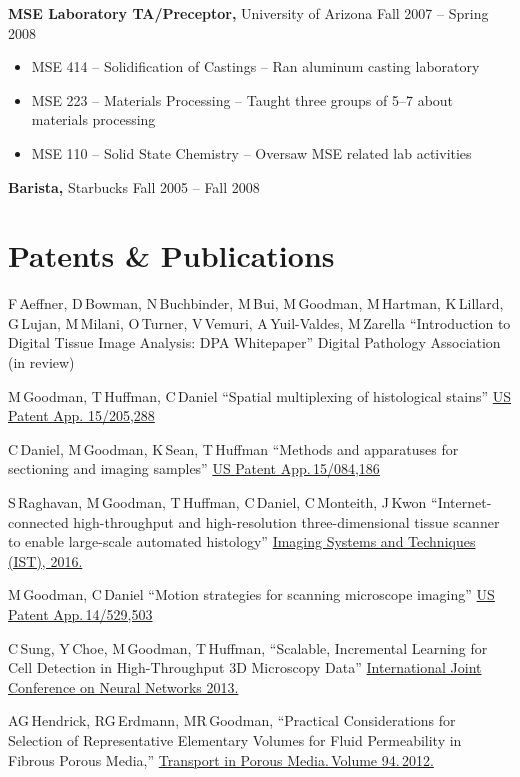 \documentclass{res}
\begin{document}
\begin{resume}
{\bf MSE Laboratory TA/Preceptor,} University of Arizona \hfill Fall 2007 -- Spring 2008
\begin{itemize} \itemsep -2pt
  \item MSE 414 -- Solidification of Castings -- Ran aluminum casting laboratory
  \item MSE 223 -- Materials Processing -- Taught three groups of 5--7 about materials processing
  \item MSE 110 -- Solid State Chemistry -- Oversaw MSE related lab activities
\end{itemize}

{\bf Barista,} Starbucks \hfill Fall 2005 -- Fall 2008

\section{Patents \& Publications}

  F\,Aeffner, D\,Bowman, N\,Buchbinder, M\,Bui, M\,Goodman, M\,Hartman, K\,Lillard,
  G\,Lujan, M\,Milani, O\,Turner, V\,Vemuri, A\,Yuil-Valdes, M\,Zarella
  ``Introduction to Digital Tissue Image Analysis: DPA Whitepaper''
  Digital Pathology Association (in review)

  M\,Goodman, T\,Huffman, C\,Daniel
  ``Spatial multiplexing of histological stains''
  \href{https://patents.google.com/patent/US20170011511A1/en}{US Patent App. 15/205,288}

  C\,Daniel, M\,Goodman, K\,Sean, T\,Huffman
  ``Methods and apparatuses for sectioning and imaging samples''
  \href{https://patents.google.com/patent/US20160290895A1/en}{US Patent App.\,15/084,186}

  S\,Raghavan, M\,Goodman, T\,Huffman, C\,Daniel, C\,Monteith, J\,Kwon
  ``Internet-connected high-throughput and high-resolution three-dimensional tissue scanner to
  enable large-scale automated histology''
  \href{https://doi.org/10.1109/IST.2016.7738254}{Imaging Systems and Techniques (IST), 2016.}

  M\,Goodman, C\,Daniel
  ``Motion strategies for scanning microscope imaging''
  \href{https://patents.google.com/patent/US20150138532A1/en}{US Patent App.\,14/529,503}

  C\,Sung, Y\,Choe, M\,Goodman, T\,Huffman,
  ``Scalable, Incremental Learning for Cell Detection in High-Throughput 3D Microscopy Data''
  \href{https://doi.org/10.1109/IJCNN.2013.6706769}{International Joint Conference on Neural Networks 2013.}

  AG\,Hendrick, RG\,Erdmann, MR\,Goodman,
  ``Practical Considerations for Selection of Representative
  Elementary Volumes for Fluid Permeability in Fibrous Porous Media,''
  \href{http://dx.doi.org/10.1007/s11242-012-0051-8}{Transport in Porous Media.\,Volume 94.\,2012.}


\end{resume}
\end{document}
